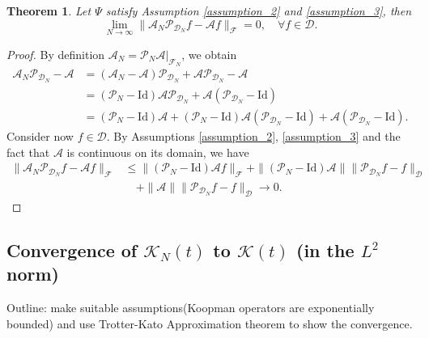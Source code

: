 \documentclass{article}[11]
\newtheorem{theorem}{Theorem}
\begin{document}
\begin{theorem}
	Let $\Psi$ satisfy Assumption \ref{assumption_2} and \ref{assumption_3}, then
	\[
	\lim_{N \to \infty} \| \mathcal{A}_N \mathcal{P}_{\mathcal{D}_N} f - \mathcal{A} f \|_{\mathcal{F}} = 0, \quad \forall f \in \mathcal{D}.
	\]
\end{theorem}

\begin{proof}
	By definition $\mathcal{A}_N = \mathcal{P}_N \mathcal{A} |_{\mathcal{F}_N}$, we obtain
	\begin{align*}
		\mathcal{A}_N \mathcal{P}_{\mathcal{D}_N} - \mathcal{A} &= (\mathcal{A}_N - \mathcal{A}) \mathcal{P}_{\mathcal{D}_N} + \mathcal{A} \mathcal{P}_{\mathcal{D}_N} - \mathcal{A} \\
		&= (\mathcal{P}_N - \mathrm{Id}) \mathcal{A} \mathcal{P}_{\mathcal{D}_N} + \mathcal{A} (\mathcal{P}_{\mathcal{D}_N} - \mathrm{Id}) \\
		&= (\mathcal{P}_N - \mathrm{Id}) \mathcal{A} + (\mathcal{P}_N - \mathrm{Id}) \mathcal{A} (\mathcal{P}_{\mathcal{D}_N} - \mathrm{Id}) + \mathcal{A} (\mathcal{P}_{\mathcal{D}_N} - \mathrm{Id}).
	\end{align*}	
	Consider now $f \in \mathcal{D}$. By Assumptions \ref{assumption_2}, \ref{assumption_3} and the fact that $\mathcal{A}$ is continuous on its domain, we have
	\begin{align*}
		\| \mathcal{A}_N \mathcal{P}_{\mathcal{D}_N} f - \mathcal{A} f \|_{\mathcal{F}} &\leq \| (\mathcal{P}_N - \mathrm{Id}) \mathcal{A} f \|_{\mathcal{F}} + \| (\mathcal{P}_N - \mathrm{Id}) \mathcal{A} \| \| \mathcal{P}_{\mathcal{D}_N} f - f \|_{\mathcal{D}} \\
		&\quad + \| \mathcal{A} \| \| \mathcal{P}_{\mathcal{D}_N} f - f \|_{\mathcal{D}} \to 0.
	\end{align*}	
\end{proof}




\subsection{Convergence of \(\mathcal{K}_N(t)\) to \(\mathcal{K}(t)\) (in the \(L^2\) norm)}

Outline: make suitable assumptions(Koopman operators are exponentially bounded) and use Trotter-Kato Approximation theorem to show the convergence.
\end{document}
